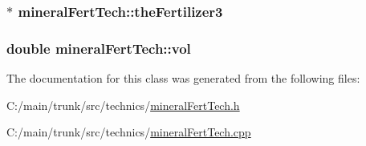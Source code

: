 \hypertarget{classmineral_fert_tech_a0aee75fa1b75ebd90d1d807ba5f5808c}{
\subsubsection[{theFertilizer3}]{$\ast$ {\bf mineralFertTech::theFertilizer3}}}
\label{classmineral_fert_tech_a0aee75fa1b75ebd90d1d807ba5f5808c}
\hypertarget{classmineral_fert_tech_a5efd688c8112069834436a3a5b2f9915}{
\subsubsection[{vol}]{\setlength{\rightskip}{0pt plus 5cm}double {\bf mineralFertTech::vol}}}
\label{classmineral_fert_tech_a5efd688c8112069834436a3a5b2f9915}


The documentation for this class was generated from the following files:\begin{DoxyCompactItemize}
\item 
C:/main/trunk/src/technics/\hyperlink{mineral_fert_tech_8h}{mineralFertTech.h}\item 
C:/main/trunk/src/technics/\hyperlink{mineral_fert_tech_8cpp}{mineralFertTech.cpp}\end{DoxyCompactItemize}

